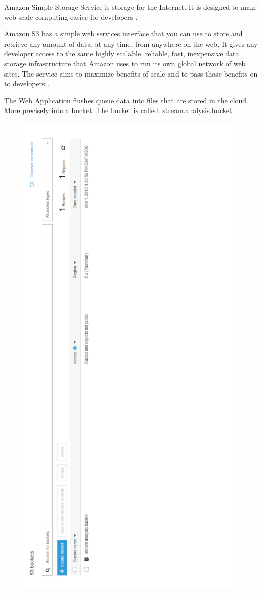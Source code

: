 Amazon Simple Storage Service is storage for the Internet. It is designed to make web-scale computing easier for developers \cite{s3}.

Amazon S3 has a simple web services interface that you can use to store and retrieve any amount of data, at any time, from anywhere on the web. It gives any developer access to the same highly scalable, reliable, fast, inexpensive data storage infrastructure that Amazon uses to run its own global network of web sites. The service aims to maximize benefits of scale and to pass those benefits on to developers \cite{s3}.

The Web Application flushes queue data into files that are stored in the cloud. More precisely into a bucket. The bucket is called: stream.analysis.bucket.

\begin{figure}[p]
	\centering
	\noindent
	\includegraphics[width=0.5\paperwidth]{./images/aws_resources/S3.PNG}

\end{figure}
